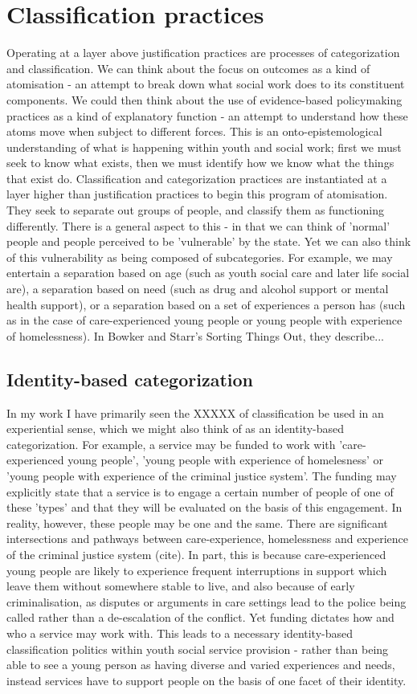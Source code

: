 \section{Classification practices}
Operating at a layer above justification practices are processes of categorization and classification. We can think about the focus on outcomes as a kind of atomisation - an attempt to break down what social work does to its constituent components. We could then think about the use of evidence-based policymaking practices as a kind of explanatory function - an attempt to understand how these atoms move when subject to different forces. This is an onto-epistemological understanding of what is happening within youth and social work; first we must seek to know what exists, then we must identify how we know what the things that exist do. Classification and categorization practices are instantiated at a layer higher than justification practices to begin this program of atomisation. They seek to separate out groups of people, and classify them as functioning differently. There is a general aspect to this - in that we can think of 'normal' people and people perceived to be 'vulnerable' by the state. Yet we can also think of this vulnerability as being composed of subcategories. For example, we may entertain a separation based on age (such as youth social care and later life social are), a separation based on need (such as drug and alcohol support or mental health support), or a separation based on a set of experiences a person has (such as in the case of care-experienced young people or young people with experience of homelessness).
In Bowker and Starr's Sorting Things Out, they describe...

\subsection{Identity-based categorization}
In my work I have primarily seen the XXXXX of classification be used in an experiential sense, which we might also think of as an identity-based categorization. For example, a service may be funded to work with 'care-experienced young people', 'young people with experience of homelesness' or 'young people with experience of the criminal justice system'. The funding may explicitly state that a service is to engage a certain number of people of one of these 'types' and that they will be evaluated on the basis of this engagement. In reality, however, these people may be one and the same. There are significant intersections and pathways between care-experience, homelessness and experience of the criminal justice system (cite). In part, this is because care-experienced young people are likely to experience frequent interruptions in support which leave them without somewhere stable to live, and also because of early criminalisation, as disputes or arguments in care settings lead to the police being called rather than a de-escalation of the conflict. Yet funding dictates how and who a service may work with. This leads to a necessary identity-based classification politics within youth social service provision - rather than being able to see a young person as having diverse and varied experiences and needs, instead services have to support people on the basis of one facet of their identity.

